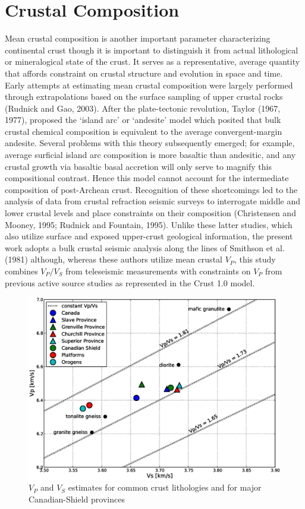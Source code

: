 \documentclass[msc,oneside]{ubcthesis}
\begin{document}
\section{Crustal Composition} \label{section:crustalcomp}
Mean crustal composition is another important parameter characterizing continental crust though it is important to distinguish it from actual lithological or mineralogical state of the crust. It serves as a representative, average quantity that affords constraint on crustal structure and evolution in space and time. Early attempts at estimating mean crustal composition were largely performed through extrapolations based on the surface sampling of upper crustal rocks (Rudnick and Gao, 2003). After the plate-tectonic revolution, Taylor (1967, 1977), proposed the `island arc' or `andesite' model which posited that bulk crustal chemical composition is equivalent to the average convergent-margin andesite. Several problems with this theory subsequently emerged; for example, average surficial island arc composition is more basaltic than andesitic, and any crustal growth via basaltic basal accretion will only serve to magnify this compositional contrast. Hence this model cannot account for the intermediate composition of post-Archean crust. Recognition of these shortcomings led to the analysis of data from crustal refraction seismic surveys to interrogate middle and lower crustal levels and place constraints on their composition (Christensen and Mooney, 1995; Rudnick and Fountain, 1995). Unlike these latter studies, which also utilize surface and exposed upper-crust geological information, the present work adopts a bulk crustal seismic analysis along the lines of Smithson et al. (1981) although, whereas these authors utilize mean crustal $V_P$, this study combines $V_P/V_S$ from teleseismic measurements with constraints on $V_P$ from previous active source studies as represented in the Crust 1.0 model.

\begin{figure}
  \centering
  \includegraphics[width=\textwidth]{lithology.eps}
  \caption[$V_P$ and $V_S$ estimates for lithologies and regions]{$V_P$ and $V_S$ estimates for common crust lithologies and for major Canadian-Shield provinces}
  \label{fig:lith}
\end{figure}
\end{document}
